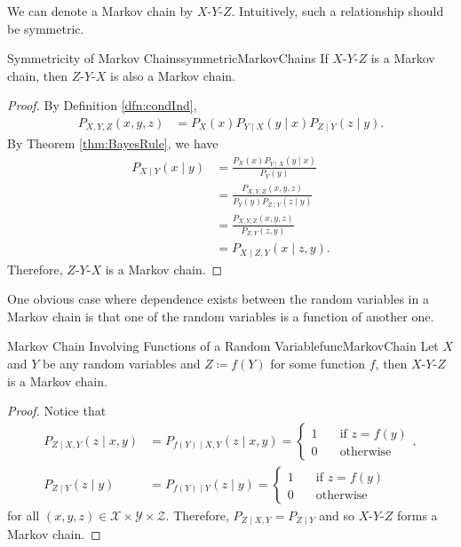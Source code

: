 \documentclass[math, code]{amznotes}
\theoremstyle{remark}
\begin{document}
We can denote a Markov chain by $X$-$Y$-$Z$. Intuitively, such a relationship should be symmetric.
\begin{probox}{Symmetricity of Markov Chains}{symmetricMarkovChains}
    If $X$-$Y$-$Z$ is a Markov chain, then $Z$-$Y$-$X$ is also a Markov chain.
    \tcblower
    \begin{proof}
        By Definition \ref{dfn:condInd}, 
        \begin{align*}
            P_{X, Y, Z}\left(x, y, z\right) & = P_X\left(x\right)P_{Y \mid X}\left(y \mid x\right)P_{Z \mid Y}\left(z \mid y\right).
        \end{align*}
        By Theorem \ref{thm:BayesRule}, we have 
        \begin{align*}
            P_{X \mid Y}\left(x \mid y\right) & = \frac{P_X\left(x\right)P_{Y \mid X}\left(y \mid x\right)}{P_Y\left(y\right)} \\
            & = \frac{P_{X, Y, Z}\left(x, y, z\right)}{P_Y\left(y\right)P_{Z \mid Y}\left(z \mid y\right)} \\
            & = \frac{P_{X, Y, Z}\left(x, y, z\right)}{P_{Z, Y}\left(z, y\right)} \\
            & = P_{X \mid Z, Y}\left(x \mid z, y\right).
        \end{align*}
        Therefore, $Z$-$Y$-$X$ is a Markov chain.
    \end{proof}
\end{probox}
One obvious case where dependence exists between the random variables in a Markov chain is that one of the random variables is a function of another one.
\begin{probox}{Markov Chain Involving Functions of a Random Variable}{funcMarkovChain}
    Let $X$ and $Y$ be any random variables and $Z \coloneqq f\left(Y\right)$ for some function $f$, then $X$-$Y$-$Z$ is a Markov chain.
    \tcblower
    \begin{proof}
        Notice that 
        \begin{align*}
            P_{Z \mid X, Y}\left(z \mid x, y\right) & = P_{f\left(Y\right) \mid X, Y}\left(z \mid x, y\right) = \begin{cases}
                1 &\quad \textrm{if } z = f\left(y\right) \\
                0 &\quad \textrm{otherwise} 
            \end{cases}, \\
            P_{Z \mid Y}\left(z \mid y\right) & = P_{f\left(Y\right) \mid Y}\left(z \mid y\right) = \begin{cases}
                1 &\quad \textrm{if } z = f\left(y\right) \\
                0 &\quad \textrm{otherwise} 
            \end{cases}
        \end{align*}
        for all $\left(x, y, z\right) \in \mathcal{X} \times \mathcal{Y} \times \mathcal{Z}$. Therefore, $P_{Z \mid X, Y} = P_{Z \mid Y}$ and so $X$-$Y$-$Z$ forms a Markov chain.
    \end{proof}
\end{probox}
\end{document}

